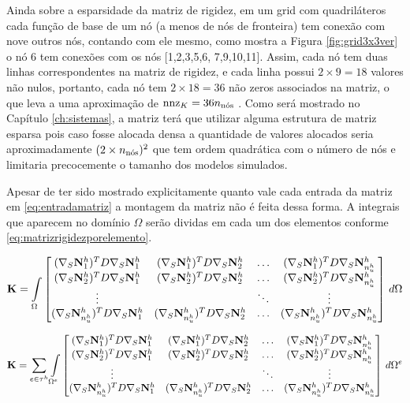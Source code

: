 Ainda sobre a esparsidade da matriz de rigidez, em um grid com quadriláteros cada função de base de um nó (a menos de nós de fronteira) tem conexão com nove outros nós, contando com ele mesmo, como mostra a Figura \ref{fig:grid3x3ver} o nó 6 tem conexões com os nós [1,2,3,5,6, 7,9,10,11]. Assim, cada nó tem duas linhas correspondentes na matriz de rigidez, e cada linha possui $2 \times 9 = 18$ valores não nulos, portanto, cada nó tem $2 \times 18 = 36$ não zeros associados na matriz, o que leva a uma aproximação de $\text{nnz}_K = 36 \qtdnos$ . Como será mostrado no Capítulo \ref{ch:sistemas}, a matriz terá que utilizar alguma estrutura de matriz esparsa pois caso fosse alocada densa a quantidade de valores alocados seria aproximadamente $(2 \times \qtdnos)^2$ que tem ordem quadrática com o número de nós e limitaria precocemente o tamanho dos modelos simulados. 


Apesar de ter sido mostrado explicitamente quanto vale cada entrada da matriz em \eqref{eq:entradamatriz} a montagem da matriz não é feita dessa forma. A integrais que aparecem no domínio $\Omega$ serão dividas em cada um dos elementos conforme \eqref{eq:matrizrigidezporelemento}. 

\begin{equation}
\mathbf{K}  = \omeint{
\begin{bmatrix}
\kij{1}{1} & \kij{1}{2}  & \hdots & \kij{1}{\freedomfine} \\ 
\kij{2}{1} & \kij{2}{2}  & \hdots & \kij{2}{\freedomfine} \\ 
\vdots &  & \ddots & \vdots\\ 
\kij{\freedomfine}{1} & \kij{\freedomfine}{2}  & \hdots & \kij{\freedomfine}{\freedomfine} 
\end{bmatrix}
}
\end{equation}

\begin{equation}\label{eq:matrizrigidezporelemento}
\mathbf{K}  = \sum_{e \in \tau^h} \omeeint{
\begin{bmatrix}
\kij{1}{1} & \kij{1}{2}  & \hdots & \kij{1}{\freedomfine} \\ 
\kij{2}{1} & \kij{2}{2}  & \hdots & \kij{2}{\freedomfine} \\ 
\vdots     &             & \ddots & \vdots\\ 
\kij{\freedomfine}{1} & \kij{\freedomfine}{2}  & \hdots & \kij{\freedomfine}{\freedomfine} 
\end{bmatrix}
}
\end{equation}


